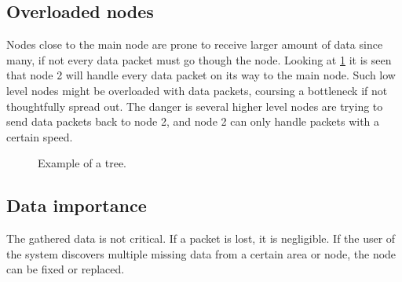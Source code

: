 \subsection{Overloaded nodes}
Nodes close to the main node are prone to receive larger amount of data since many, if not every data packet must go though the node. Looking at \ref{fig:overloadtree} it is seen that node 2 will handle every data packet on its way to the main node. Such low level nodes might be overloaded with data packets, coursing a bottleneck if not thoughtfully spread out. The danger is several higher level nodes are trying to send data packets back to node 2, and node 2 can only handle packets with a certain speed.
\begin{figure}[!h]
	\centering
	\caption{Example of a tree.}
	\label{fig:overloadtree}
\end{figure}

\subsection{Data importance}
The gathered data is not critical. If a packet is lost, it is negligible. If the user of the system discovers multiple missing data from a certain area or node, the node can be fixed or replaced.